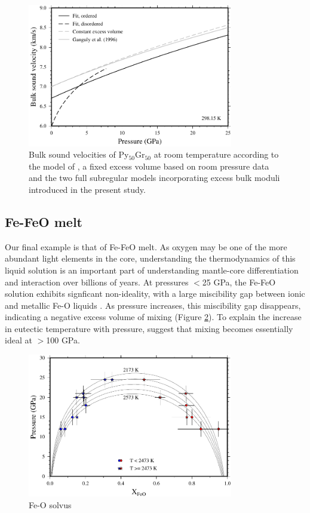 \documentclass[review]{elsarticle}
\begin{document}
\begin{figure}[ht!]
  \centering
  \includegraphics[width=0.8\textwidth]{figures/pyrope_grossular_bulk_sound_velocities}
  \caption{Bulk sound velocities of Py$_{50}$Gr$_{50}$ at room temperature according to the model of \citep{GCT1996}, a fixed excess volume based on room pressure data \citep{DCW2015} and the two full subregular models incorporating excess bulk moduli introduced in the present study.}
  \label{fig:bulk_sound_garnet}
\end{figure}



\clearpage
\subsection{Fe-FeO melt}

Our final example is that of Fe-FeO melt. As oxygen may be one of the more abundant light elements in the core, understanding the thermodynamics of this liquid solution is an important part of understanding mantle-core differentiation and interaction over billions of years. At pressures $<$25 GPa, the Fe-FeO solution exhibits signficant non-ideality, with a large miscibility gap between ionic and metallic Fe-O liquids \citep{KS1995,TOT2007,Frostetal2010}. As pressure increases, this miscibility gap disappears, indicating a negative excess volume of mixing (Figure \ref{fig:Fe_O_solvus}). To explain the increase in eutectic temperature with pressure, \cite{Kom2014} suggest that mixing becomes essentially ideal at $>$100 GPa. 

\begin{figure}[ht!]
  \centering
  \includegraphics[width=0.8\textwidth]{figures/Fe_FeO_solvus}
  \caption{Fe-O solvus}
  \label{fig:Fe_O_solvus}
\end{figure}
\end{document}

